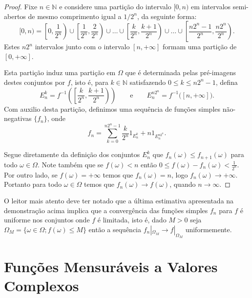 \begin{proof} 
Fixe $n\in\mathbb{N}$ e considere uma partição do 
intervalo $[0,n)$ em intervalos semi-abertos de
mesmo comprimento igual a $1/2^n$, da seguinte 
forma:
\[
[0,n)
=
\left[ 0,\frac{1}{2^n} \right) 
\cup
\left[ \frac{1}{2^n},\frac{2}{2^n} \right) 
\cup
\ldots
\cup 
\left[ \frac{k}{2^n},\frac{k+1}{2^n} \right) 
\cup
\ldots
\cup
\left[ \frac{n2^n-1}{2^n}, \frac{n2^n}{2^n} \right).
\]
Estes $n2^n$ intervalos 
junto com o intervalo $[n,+\infty]$ formam uma partição 
de $[0,+\infty]$. 

Esta partição induz uma partição em $\Omega$
que é determinada pelas pré-imagens destes conjuntos 
por $f$, isto é, para $k\in\mathbb{N}$ satisfazendo 
$0\leq k\leq n2^{n}-1$, defina
\[
E_{n}^{k}=
f^{-1}\left( \left[\frac{k}{2^n},\frac{k+1}{2^n} \right) \right)
\qquad \text{e} \qquad
E_n^{n2^n}=f^{-1}\big( [n,+\infty]\big).
\]
Com auxilio desta partição, 
definimos uma sequência de funções simples
não-negativas $\{f_n\}$, onde 
\[
f_n =\sum_{k=0}^{n2^n-1} \frac{k}{2^n} 1_{E_{n}^{k}} + n 1_{E_n^{n2^n}}.
\]

Segue diretamente da definição dos conjuntos 
$E_{n}^{k}$ que $f_n(\omega)\leq f_{n+1}(\omega)$ 
para todo $\omega\in\Omega$.
Note também que se $f(\omega)<n$ 
então $0\leq f(\omega)-f_n(\omega)<\frac{1}{2^n}$. 
Por outro lado, se 
$f(\omega)=+\infty$ temos que $f_n(\omega)= n$,
logo $f_n(\omega)\to+\infty$.
Portanto para todo $\omega\in\Omega$ temos que 
$f_n(\omega)\to f(\omega)$, quando $n\to\infty$.
\end{proof}

\begin{observacao} 
O leitor mais atento deve ter notado que 
a última estimativa apresentada na demonstração acima 
implica que a convergência das funções simples $f_n$ 
para $f$ é uniforme nos conjuntos 
onde $f$ é limitada, isto é, dado $M>0$ 
seja $\Omega_M=\{\omega\in\Omega; f(\omega)\leq M\}$ então a sequência 
$f_n|_{\Omega_M}\to f|_{\Omega_M}$ uniformemente.
\end{observacao}

 







\section{Funções Mensuráveis a Valores Complexos}

